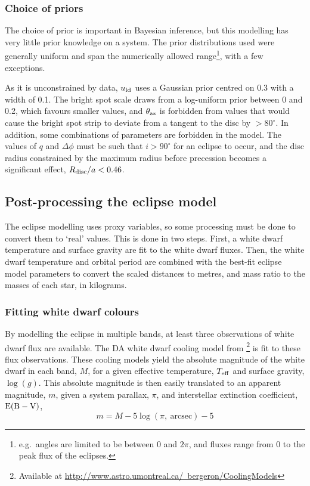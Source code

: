 \subsubsection{Choice of priors}

The choice of prior is important in Bayesian inference, but this modelling has very little prior knowledge on a system. The prior distributions used were generally uniform and span the numerically allowed range\footnote{e.g.\ angles are limited to be between 0 and $2\pi$, and fluxes range from 0 to the peak flux of the eclipses.}, with a few exceptions.

As it is unconstrained by data, $u_{\rm ld}$ uses a Gaussian prior centred on 0.3 with a width of 0.1.
The bright spot scale draws from a log-uniform prior between 0 and 0.2, which favours smaller values, and $\theta_{\rm az}$ is forbidden from values that would cause the bright spot strip to deviate from a tangent to the disc by $>80^\circ$.
In addition, some combinations of parameters are forbidden in the model. The values of $q$ and $\Delta\phi$ must be such that $i > 90^\circ$ for an eclipse to occur, and the disc radius constrained by the maximum radius before precession becomes a significant effect, $R_{\rm disc} / a < 0.46$.


\subsection{Post-processing the eclipse model}
\label{sect:modelling:post processing the eclipse model}

The eclipse modelling uses proxy variables, so some processing must be done to convert them to `real' values. This is done in two steps. First, a white dwarf temperature and surface gravity are fit to the white dwarf fluxes. Then, the white dwarf temperature and orbital period are combined with the best-fit eclipse model parameters to convert the scaled distances to metres, and mass ratio to the masses of each star, in kilograms.

\subsubsection{Fitting white dwarf colours}
\label{sect:modelling:fitting white dwarf colours}
By modelling the eclipse in multiple bands, at least three observations of white dwarf flux are available.
The DA white dwarf cooling model from \citet{Bergeron1995}\footnote{Available at \href{http://www.astro.umontreal.ca/~bergeron/CoolingModels}{http://www.astro.umontreal.ca/~bergeron/CoolingModels}} is fit to these flux observations.
These cooling models yield the absolute magnitude of the white dwarf in each band, $M$, for a given effective temperature, $T_{\rm eff}$ and surface gravity, $\log (g)$. This absolute magnitude is then easily translated to an apparent magnitude, $m$, given a system parallax, $\pi$, and interstellar extinction coefficient, ${\rm E(B-V)}$,
\begin{equation}
    m = M - 5\log (\pi\mathrm{,\ arcsec}) - 5
\end{equation}

